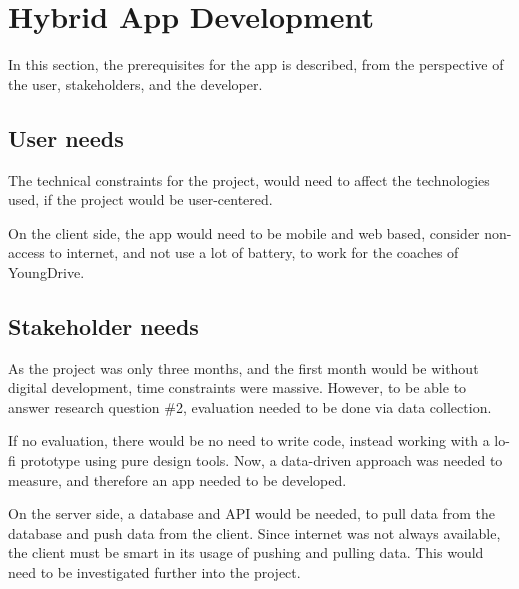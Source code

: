 \section{Hybrid App Development}

In this section, the prerequisites for the app is described, from the perspective of the user, stakeholders, and the developer.

\subsection{User needs}

The technical constraints for the project, would need to affect the technologies used, if the project would be user-centered.

On the client side, the app would need to be mobile and web based, consider non-access to internet, and not use a lot of battery, to work for the coaches of YoungDrive.

\subsection{Stakeholder needs}

As the project was only three months, and the first month would be without digital development, time constraints were massive. However, to be able to answer research question \#2, evaluation needed to be done via data collection.

If no evaluation, there would be no need to write code, instead working with a lo-fi prototype using pure design tools. Now, a data-driven approach was needed to measure, and therefore an app needed to be developed.

On the server side, a database and API would be needed, to pull data from the database and push data from the client. Since internet was not always available, the client must be smart in its usage of pushing and pulling data. This would need to be investigated further into the project.
